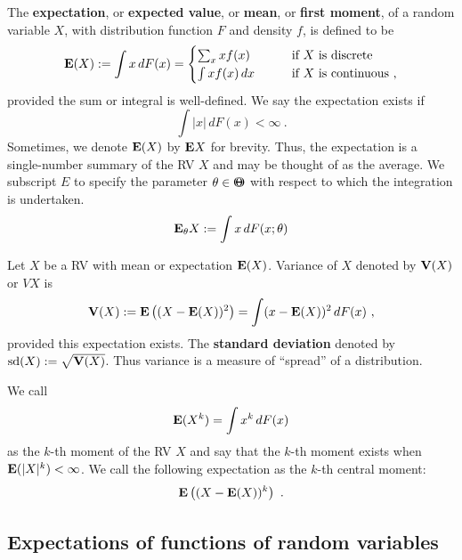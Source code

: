 \begin{definition}[Expectation of a RV]
The {\bf expectation}, or {\bf expected value}, or {\bf mean}, or {\bf first moment}, of a random variable $X$, with distribution function $F$ and density $f$, is defined to be
\begin{equation}\label{E:Mean}
\mathbf{E}(X) := \int x\,dF(x) = 
\begin{cases}
\sum_x x f(x) & \qquad \text{if $X$ is discrete} \\
\int x f(x)\,dx  & \qquad \text{if $X$ is continuous} \  ,
\end{cases}
\end{equation}
provided the sum or integral is well-defined.  We say the expectation exists if
\begin{equation}\label{E:ExpectationExists}
\int \left|x\right|\,dF(x) < \infty \ .
\end{equation}
Sometimes, we denote $\mathbf{E}(X)$ by $\mathbf{E} X$ for brevity.  Thus, the expectation is a single-number summary of the RV $X$ and may be thought of  as the average.
We subscript $E$ to specify the parameter $\theta \in {\Theta}\mspace{-11 mu}{\Theta}$ with respect to which the integration is undertaken. 
\[
\mathbf{E}_{\theta} X := \int x\,dF(x;\theta)
\]
\end{definition}

\begin{definition}[Variance of a RV]\label{D:VarianceofX}
Let $X$ be a RV with mean or expectation $\mathbf{E}(X)$.  Variance of $X$ denoted by $\mathbf{V}(X)$ or $VX$ is
\[
\mathbf{V}(X) := \mathbf{E} \left((X-\mathbf{E}(X))^2\right) = \int (x-\mathbf{E}(X))^2 \,d F(x) \ ,
\]
provided this expectation exists.  The {\bf standard deviation} denoted by ${\rm sd}(X) := \sqrt{\mathbf{V}(X)}$.
Thus variance is a measure of ``spread'' of a distribution.
\end{definition}

\begin{definition}[$k$-th moment of a RV]
We call 
\[
\mathbf{E}(X^k) = \int x^k\,dF(x)
\]
as the $k$-th moment of the RV $X$ and say that the $k$-th moment exists when $\mathbf{E}(|X|^k) < \infty$.  We call the following expectation as the $k$-th central moment:
\[
\mathbf{E} \left((X- \mathbf{E}(X))^k\right) \ .
\]
\end{definition}


\subsection{Expectations of functions of random variables}\label{S:ExpectationsOfFunsOfRVs}

